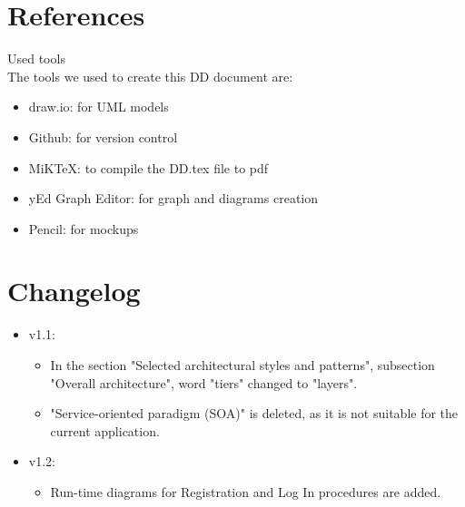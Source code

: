 \documentclass[12pt, letterpaper]{article}
\begin{document}
\newpage
\section{References}
Used tools \\
The tools we used to create this DD document are:
\begin{itemize}
	\item draw.io: for UML models
	\item Github: for version control
	\item MiKTeX: to compile the DD.tex file to pdf
	\item yEd Graph Editor: for graph and diagrams creation
	\item Pencil: for mockups
\end{itemize}
\newpage


\section{Changelog}
\begin{itemize}
	\item v1.1:
	\begin{itemize}
		\item In the section "Selected architectural styles and patterns", subsection "Overall architecture", word "tiers" changed to "layers".
		\item "Service-oriented paradigm (SOA)" is deleted, as it is not suitable for the current application.  
	\end{itemize}	
	\item v1.2:
	\begin{itemize}
		\item Run-time diagrams for Registration and Log In procedures are added.
	\end{itemize} 	
\end{itemize}
\end{document}
